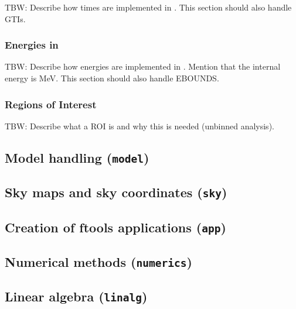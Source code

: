 \documentclass{article}[12pt,a4]
\begin{document}
TBW: Describe how times are implemented in \this. This section should also handle GTIs.


\subsubsection{Energies in \this}
\label{sec:energy}

TBW: Describe how energies are implemented in \this. Mention that the internal energy is MeV.
This section should also handle EBOUNDS.


\subsubsection{Regions of Interest}
\label{sec:roi}

TBW: Describe what a ROI is and why this is needed (unbinned analysis).


\subsection{Model handling ({\tt model})}
\label{sec:model}


\subsection{Sky maps and sky coordinates ({\tt sky})}
\label{sec:sky}


\subsection{Creation of ftools applications ({\tt app})}
\label{sec:app}


\subsection{Numerical methods ({\tt numerics})}
\label{sec:numerics}


\subsection{Linear algebra ({\tt linalg})}
\label{sec:linalg}
\end{document}
